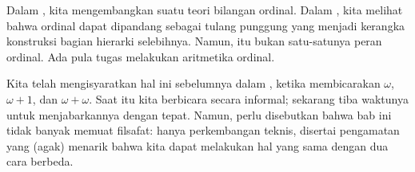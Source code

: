 \documentclass[../../../include/open-logic-section]{subfiles}
\begin{document}


Dalam , kita mengembangkan suatu teori bilangan
ordinal. Dalam , kita melihat bahwa ordinal dapat
dipandang sebagai tulang punggung yang menjadi kerangka konstruksi bagian
hierarki selebihnya. Namun, itu bukan satu-satunya peran ordinal. Ada pula
tugas melakukan aritmetika ordinal.

Kita telah mengisyaratkan hal ini sebelumnya dalam
, ketika membicarakan $\omega$, $\omega+1$, dan
$\omega+\omega$. Saat itu kita berbicara secara informal; sekarang tiba
waktunya untuk menjabarkannya dengan tepat. Namun, perlu disebutkan bahwa bab
ini tidak banyak memuat filsafat: hanya perkembangan teknis, disertai
pengamatan yang (agak) menarik bahwa kita dapat melakukan hal yang sama dengan
dua cara berbeda.
\end{document}
